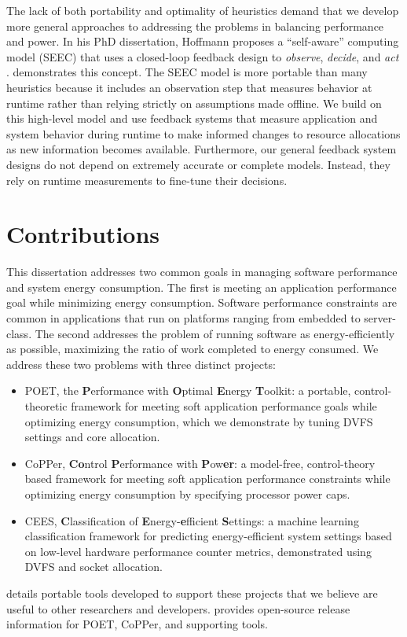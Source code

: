 The lack of both portability and optimality of heuristics demand that we develop more general approaches to addressing the problems in balancing performance and power.
In his PhD dissertation, Hoffmann proposes a ``self-aware'' computing model (SEEC) that uses a closed-loop feedback design to \emph{observe}, \emph{decide}, and \emph{act} \cite{HoffmannPhD}.
 demonstrates this concept.
The SEEC model is more portable than many heuristics because it includes an observation step that measures behavior at runtime rather than relying strictly on assumptions made offline.
We build on this high-level model and use feedback systems that measure application and system behavior during runtime to make informed changes to resource allocations as new information becomes available.
Furthermore, our general feedback system designs do not depend on extremely accurate or complete models.
Instead, they rely on runtime measurements to fine-tune their decisions.


\section{Contributions}

This dissertation addresses two common goals in managing software performance and system energy consumption.
The first is meeting an application performance goal while minimizing energy consumption.
Software performance constraints are common in applications that run on platforms ranging from embedded to server-class.
The second addresses the problem of running software as energy-efficiently as possible, \ie maximizing the ratio of work completed to energy consumed.
We address these two problems with three distinct projects:
\begin{itemize}
\item POET, the \textbf{P}erformance with \textbf{O}ptimal \textbf{E}nergy \textbf{T}oolkit: a portable, control-theoretic framework for meeting soft application performance goals while optimizing energy consumption, which we demonstrate by tuning DVFS settings and core allocation.
\item CoPPer, \textbf{Co}ntrol \textbf{P}erformance with \textbf{P}ow\textbf{er}: a model-free, control-theory based framework for meeting soft application performance constraints while optimizing energy consumption by specifying processor power caps.
\item CEES, \textbf{C}lassification of \textbf{E}nergy-\textbf{e}fficient \textbf{S}ettings: a machine learning classification framework for predicting energy-efficient system settings based on low-level hardware performance counter metrics, demonstrated using DVFS and socket allocation.
\end{itemize}
 details portable tools developed to support these projects that we believe are useful to other researchers and developers.
 provides open-source release information for POET, CoPPer, and supporting tools.


